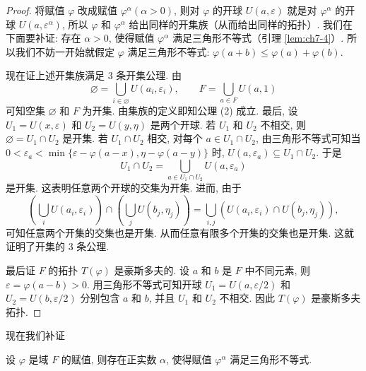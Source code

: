 \begin{proof}
将赋值 $\varphi$ 改成赋值 $\varphi^{\alpha}(\alpha>0)$, 则对 $\varphi$ 的开球 $U(a,\varepsilon)$ 就是对 $\varphi^{\alpha}$ 的开球 $U(a,\varepsilon^{\alpha})$, 所以 $\varphi$ 和 $\varphi^{\alpha}$ 给出同样的开集族（从而给出同样的拓扑）. 我们在下面要补证: 存在 $\alpha>0$, 使得赋值 $\varphi^{\alpha}$ 满足三角形不等式（引理 \ref{lem:ch7-4}）. 所以我们不妨一开始就假定 $\varphi$ 满足三角形不等式: $\varphi(a+b)\leqslant\varphi(a)+\varphi(b)$.

现在证上述开集族满足 $3$ 条开集公理. 由
\[
  \varnothing=\bigcup_{i\in\varnothing}U(a_i,\varepsilon_i),\qquad F=\bigcup_{a\in F}U(a,1)
\]
可知空集 $\varnothing$ 和 $F$ 为开集. 由集族的定义即知公理 (2) 成立. 最后, 设 $U_1=U(x,\varepsilon)$ 和 $U_2=U(y,\eta)$ 是两个开球. 若 $U_1$ 和 $U_2$ 不相交, 则 $\varnothing=U_1\cap U_2$ 是开集. 若 $U_1\cap U_2$ 相交, 对每个 $a\in U_1\cap U_2$, 由三角形不等式可知当 $0<\varepsilon_a<\min\{\varepsilon-\varphi(a-x),\eta-\varphi(a-y)\}$ 时, $U(a,\varepsilon_a)\subseteq U_1\cap U_2$. 于是
\[
  U_1\cap U_2=\bigcup_{a\in U_1\cap U_2}U(a,\varepsilon_a)
\]
是开集. 这表明任意两个开球的交集为开集. 进而, 由于
\[
  \left(\bigcup_iU(a_i,\varepsilon_i)\right)\cap\left(\bigcup_jU(b_j,\eta_j)\right)
  =\bigcup_{i,j}\left(U(a_i,\varepsilon_i)\cap U(b_j,\eta_j)\right),
\]
可知任意两个开集的交集也是开集. 从而任意有限多个开集的交集也是开集. 这就证明了开集的 $3$ 条公理.

最后证 $F$ 的拓扑 $T(\varphi)$ 是豪斯多夫的. 设 $a$ 和 $b$ 是 $F$ 中不同元素, 则 $\varepsilon=\varphi(a-b)>0$. 用三角形不等式可知开球 $U_1=U(a,\varepsilon/2)$ 和 $U_2=U(b,\varepsilon/2)$ 分别包含 $a$ 和 $b$, 并且 $U_1$ 和 $U_2$ 不相交. 因此 $T(\varphi)$ 是豪斯多夫拓扑.
\end{proof}

现在我们补证

\begin{lemma}\label{lem:ch7-4}
设 $\varphi$ 是域 $F$ 的赋值, 则存在正实数 $\alpha$, 使得赋值 $\varphi^{\alpha}$ 满足三角形不等式.
\end{lemma}

